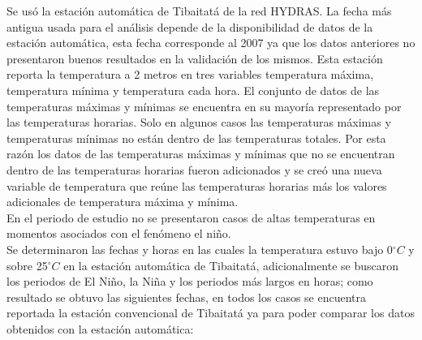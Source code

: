 \documentclass[11pt]{article}
\def\celc{$^{\circ}C$ }%
\begin{document}
Se usó la estación automática de Tibaitatá de la red HYDRAS. La fecha más antigua usada para el análisis depende de la disponibilidad de datos de la estación automática, esta fecha corresponde al 2007 ya que los datos anteriores no presentaron buenos resultados en la validación de los mismos. Esta estación reporta la temperatura a 2 metros en tres variables temperatura máxima, temperatura mínima y temperatura cada hora. El conjunto de datos de las temperaturas máximas y mínimas se encuentra en su mayoría representado por las temperaturas horarias. Solo en algunos casos las temperaturas máximas y temperaturas mínimas no están dentro de las temperaturas totales. Por esta razón los datos de las temperaturas máximas y mínimas que no se encuentran dentro de las temperaturas horarias fueron adicionados y se creó una nueva variable de temperatura que reúne las temperaturas horarias más los valores adicionales de temperatura máxima y mínima.\\

En el periodo de estudio no se presentaron casos de altas temperaturas en momentos asociados con el fenómeno el niño.\\

Se determinaron las fechas y horas en las cuales la temperatura estuvo bajo 0\celc y sobre 25\celc en la estación automática de Tibaitatá, adicionalmente se buscaron los periodos de El Niño, la Niña y los periodos más largos en horas; como resultado se obtuvo las siguientes fechas, en todos los casos se encuentra reportada la estación convencional de Tibaitatá ya para poder comparar los datos obtenidos con la estación automática:
\end{document}
